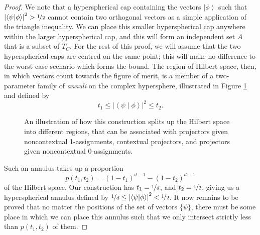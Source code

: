 \documentclass{amsart}
\theoremstyle{definition}
\newcommand{\ket}[1]{{\left\vert{#1}\right\rangle}}
\newcommand{\sprod}[2]{\left|\left< {#1} \middle| {#2} \right>\right|}
\begin{document}
\begin{proof}
We note that a hyperspherical cap containing the vectors $\ket{\phi}$ such that $\sprod{\psi}{\phi}^2> \nicefrac12$ cannot contain two orthogonal vectors as a simple application of the triangle inequality. We can place this smaller hyperspherical cap anywhere within the larger hyperspherical cap, and this will form an independent set $A$ that is a subset of $T_C$. For the rest of this proof, we will assume that the two hyperspherical caps are centred on the same point; this will make no difference to the worst case scenario which forms the bound. The region of Hilbert space, then, in which vectors count towards the figure of merit, is a member of a two-parameter family of \emph{annuli} on the complex hypersphere, illustrated in Figure \ref{annulus} and defined by
\begin{equation}
t_1\leq\sprod{\psi}{\phi}^2\leq t_2.
\end{equation}
\begin{figure}
\caption{An illustration of how this construction splits up the Hilbert space into different regions, that can be associated with projectors given noncontextual 1-assignments, contextual projectors, and projectors given noncontextual 0-assignments.}
\label{annulus}
\end{figure}
Such an annulus takes up a proportion 
\begin{equation}p(t_1,t_2)=\left(1-t_1 \right)^{d-1}-\left(1-t_2 \right)^{d-1}\end{equation}
of the Hilbert space. Our construction has $t_1=\nicefrac1d$, and $t_2=\nicefrac12$, giving us a hyperspherical annulus defined by
$\nicefrac1d\leq\sprod{\psi}{\phi}^2< \nicefrac12$.
It now remains to be proved that no matter the positions of the set of vectors $\{\psi\}$, there must be some place in which we can place this annulus such that we only intersect strictly less than $p(t_1,t_2)$ of them. 


\end{proof}
\end{document}
